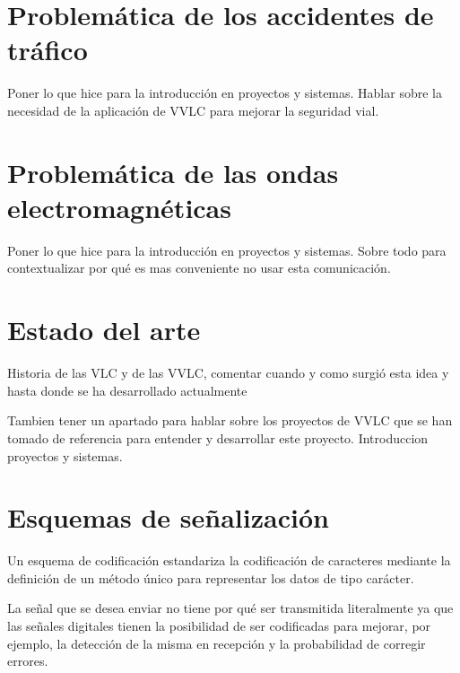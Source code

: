 
\minitoc

\section{Problemática de los accidentes de tráfico}
Poner lo que hice para la introducción en proyectos y sistemas. Hablar sobre la necesidad de la aplicación de VVLC para mejorar la seguridad vial.

\section{Problemática de las ondas electromagnéticas}
Poner lo que hice para la introducción en proyectos y sistemas. Sobre todo para contextualizar por qué es mas conveniente no usar esta comunicación.

\section{Estado del arte}

Historia de las VLC y de las VVLC, comentar cuando y como surgió esta idea y hasta donde se ha desarrollado actualmente

Tambien tener un apartado para hablar sobre los proyectos de VVLC que se han tomado de referencia para entender y desarrollar este proyecto. Introduccion proyectos y sistemas. 

\section{Esquemas de señalización}
Un esquema de codificación estandariza la codificación de caracteres mediante la definición de un 
método único para representar los datos de tipo carácter. 

La señal que se desea enviar no tiene por qué ser transmitida literalmente ya que las señales digitales tienen la posibilidad de 
ser codificadas para mejorar, por ejemplo, la detección de la misma en recepción y la probabilidad de corregir errores.

